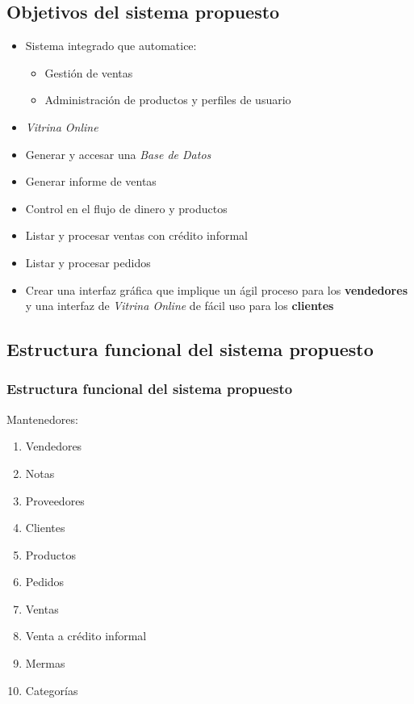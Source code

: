 \documentclass{beamer}
\begin{document}

\subsection{Objetivos del sistema propuesto}

\begin{frame}
\begin{itemize}
\frametitle{Objetivo principal del sistema propuesto}
\item Sistema integrado que automatice:
\begin{itemize}
\item Gestión de ventas
\item Administración de productos y perfiles de usuario
\end{itemize}
\item \emph{Vitrina Online}
\end{itemize}
\end{frame}

\begin{frame}
\begin{itemize}
\frametitle{Objetivo específico del sistema propuesto}
\item Generar y accesar una \emph{Base de Datos} 
\item Generar informe de ventas 
\item Control en el flujo de dinero y productos
\item Listar y procesar ventas con crédito informal
\item Listar y procesar pedidos
\item \alert{Crear una interfaz gráfica que implique un ágil proceso
para los \textbf{vendedores} y una interfaz de \emph{Vitrina Online} de 
fácil uso para los \textbf{clientes}}
\end{itemize}
\end{frame}

\subsection{Estructura funcional del sistema propuesto}

\begin{frame}
\frametitle{Estructura funcional del sistema propuesto}
Mantenedores: 
\begin{enumerate}
\item Vendedores
\item Notas
\item Proveedores
\item Clientes 
\item Productos 
\item Pedidos 
\item Ventas
\item Venta a crédito informal 
\item Mermas
\item Categorías
\end{enumerate}
\end{frame}
\end{document}
